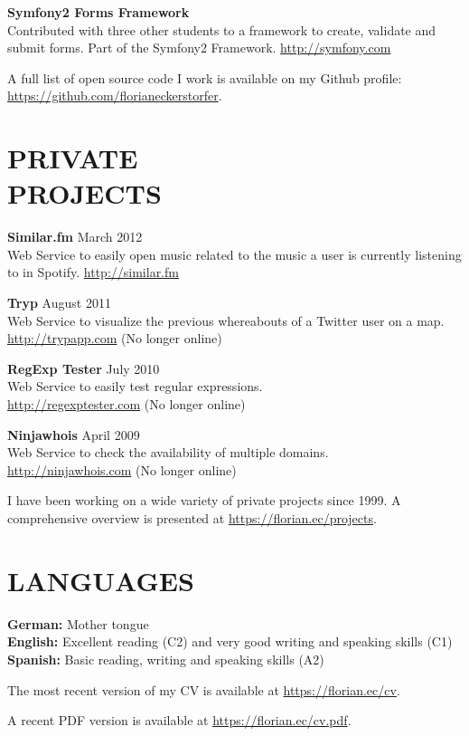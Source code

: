 \documentclass[margin]{res}
\begin{document}
\begin{resume}
\textbf{Symfony2 Forms Framework} \\
	Contributed with three other students to a framework to create, validate and submit forms. Part of the Symfony2 Framework. \url{http://symfony.com}

A full list of open source code I work is available on my Github profile: \url{https://github.com/florianeckerstorfer}.

\section{PRIVATE \\ PROJECTS}

\textbf{Similar.fm} \hfill March 2012 \\
	Web Service to easily open music related to the music a user is currently listening to in Spotify. \url{http://similar.fm}

\textbf{Tryp} \hfill August 2011 \\
	Web Service to visualize the previous whereabouts of a Twitter user on a map. \\ \url{http://trypapp.com} (No longer online)

\textbf{RegExp Tester} \hfill July 2010 \\
	Web Service to easily test regular expressions. \\ \url{http://regexptester.com} (No longer online)

\textbf{Ninjawhois} \hfill April 2009 \\
	Web Service to check the availability of multiple domains. \\ \url{http://ninjawhois.com} (No longer online)

I have been working on a wide variety of private projects since 1999. A comprehensive overview is presented at \url{https://florian.ec/projects}.


\section{LANGUAGES}

\textbf{German:} Mother tongue \\
\textbf{English:} Excellent reading (C2) and very good writing and speaking skills (C1) \\
\textbf{Spanish:} Basic reading, writing and speaking skills (A2)


\end{resume}

\vspace{15 mm}

The most recent version of my CV is available at \url{https://florian.ec/cv}.

A recent PDF version is available at \url{https://florian.ec/cv.pdf}.
\end{document}
